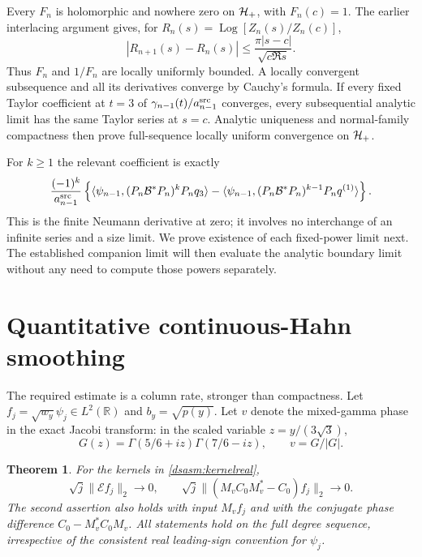 \documentclass[11pt,letterpaper]{article}
\newtheorem{theorem}{Theorem}[section]
\theoremstyle{remark}\newtheorem{remark}[theorem]{Remark}
\newcommand{\R}{\mathbb R}\newcommand{\C}{\mathbb C}\newcommand{\N}{\mathbb N}
\DeclareMathOperator{\Log}{Log}\DeclareMathOperator{\Var}{Var}
\begin{document}
Every $F_n$ is holomorphic and nowhere zero on $\mathcal H_+$, with
$F_n(c)=1$. The earlier interlacing argument gives, for
$R_n(s)=\Log[Z_n(s)/Z_n(c)]$,
\[
 |R_{n+1}(s)-R_n(s)|\le
             \frac{\pi|s-c|}{\sqrt{c\Re s}}.
\]
Thus $F_n$ and $1/F_n$ are locally uniformly bounded. A locally
convergent subsequence and all its derivatives converge by Cauchy's
formula. If every fixed Taylor coefficient at $t=3$ of
$\gamma_{n-1}(t)/a_{n-1}^{\rm src}$ converges, every subsequential
analytic limit has the same Taylor series at $s=c$. Analytic
uniqueness and normal-family compactness then prove full-sequence
locally uniform convergence on $\mathcal H_+$.

For $k\ge1$ the relevant coefficient is exactly
\begin{equation}\label{dsasm:Taylorcoef}
 \frac{(-1)^k}{a_{n-1}^{\rm src}}\left\{
 \langle\psi_{n-1},(P_n\mathcal B^*P_n)^kP_nq_3\rangle
 -\langle\psi_{n-1},(P_n\mathcal B^*P_n)^{k-1}P_nq^{(1)}\rangle
 \right\}.
\end{equation}
This is the finite Neumann derivative at zero; it involves no
interchange of an infinite series and a size limit. We prove
existence of each fixed-power limit next. The established companion
limit will then evaluate the analytic boundary limit without any
need to compute those powers separately.
\section{Quantitative continuous-Hahn smoothing}\label{dsasm:sec:smoothing}
The required estimate is a column rate, stronger than compactness.
Let $f_j=\sqrt{w_y}\psi_j\in L^2(\R)$ and $b_y=\sqrt{p(y)}$.
Let $v$ denote the mixed-gamma phase in the exact Jacobi transform:
in the scaled variable $z=y/(3\sqrt3)$,
\[
 G(z)=\Gamma(5/6+iz)\Gamma(7/6-iz),\qquad v=G/|G|.
\]

\begin{theorem}\label{dsasm:thm:smoothing}
For the kernels in \eqref{dsasm:kernelreal},
\begin{equation}\label{dsasm:smoothingrates}
 \sqrt j\|\mathcal E f_j\|_2\longrightarrow0,\qquad
 \sqrt j\|(M_vC_0M_v^*-C_0)f_j\|_2\longrightarrow0.
\end{equation}
The second assertion also holds with input $M_vf_j$ and with the
conjugate phase difference $C_0-M_v^*C_0M_v$. All statements hold
on the full degree sequence, irrespective of the consistent real
leading-sign convention for $\psi_j$.
\end{theorem}
\end{document}
